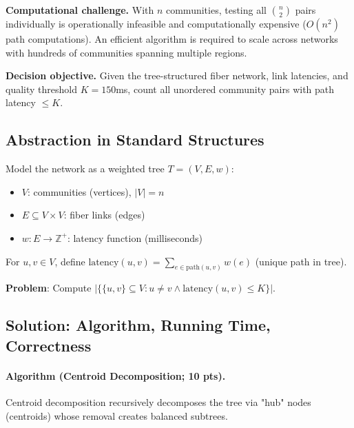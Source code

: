\documentclass[sigconf]{acmart}
\begin{document}
\textbf{Computational challenge.}
With $n$ communities, testing all $\binom{n}{2}$ pairs individually is operationally infeasible and computationally expensive ($O(n^2)$ path computations). An efficient algorithm is required to scale across networks with hundreds of communities spanning multiple regions.

\textbf{Decision objective.}
Given the tree-structured fiber network, link latencies, and quality threshold $K = 150$ms, count all unordered community pairs with path latency $\leq K$.

\subsection{Abstraction in Standard Structures}
\label{subsec:abstraction-dc}

Model the network as a weighted tree $T = (V, E, w)$:

\begin{itemize}[itemsep=0.2em]
\item $V$: communities (vertices), $|V| = n$
\item $E \subseteq V \times V$: fiber links (edges)
\item $w: E \to \mathbb{Z}^+$: latency function (milliseconds)
\end{itemize}

For $u, v \in V$, define $\text{latency}(u, v) = \sum_{e \in \text{path}(u,v)} w(e)$ (unique path in tree).

\textbf{Problem}: Compute $|\{\{u, v\} \subseteq V : u \neq v \land \text{latency}(u, v) \leq K\}|$.

\subsection{Solution: Algorithm, Running Time, Correctness}
\label{subsec:solution-dc}

\paragraph{Algorithm (Centroid Decomposition; 10 pts).}

Centroid decomposition recursively decomposes the tree via "hub" nodes (centroids) whose removal creates balanced subtrees.
\end{document}
